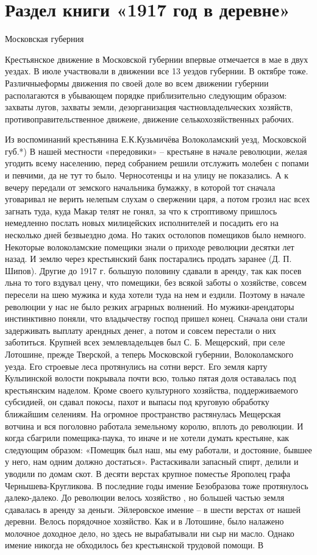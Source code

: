 \section{Раздел книги «1917 год в деревне»}

Московская губерния

Крестьянское движение в Московской губернии впервые отмечается в мае в двух уездах. В июле участвовали в движении все 13 уездов губернии. В октябре тоже. Различныеформы движения по своей доле во всем движении губернии располагаются в убывающем порядке приблизительно следующим образом: захваты лугов, захваты земли, дезорганизация частновладельческих хозяйств, противоправительственное движеие, движение селькохозяйственных рабочих.

Из воспоминаний крестьянина Е.К.Кузьмичёва Волоколамский уезд, Московской губ.*) В нашей местности «передовики» – крестьяне в начале революции, желая угодить всему населению, перед собранием решили отслужить молебен с попами и певчими, да не тут то было. Черносотенцы и на улицу не показались. А к вечеру передали от земского начальника бумажку, в которой тот сначала уговаривал не верить нелепым слухам о свержении царя, а потом грозил нас всех загнать туда, куда Макар телят не гонял, за что к строптивому пришлось немедленно послать новых милицейских исполнителей и посадить его на несколько дней безвыездно дома. Но таких остолопов помещиков было немного. Некоторые волоколамские помещики знали о приходе революции десятки лет назад. И землю через крестьянский банк постарались продать заранее (Д. П. Шипов). Другие до 1917 г. большую половину сдавали в аренду, так как посев льна то того вздувал цену, что помещики, без всякой заботы о хозяйстве, совсем пересели на шею мужика и куда хотели туда на нем и ездили. Поэтому в начале революции у нас не было резких аграрных волнений. Но мужики-арендаторы инстинктивно поняли, что владычеству господ пришел конец. Сначала они стали задерживать выплату арендных денег, а потом и совсем перестали о них заботиться. Крупней всех землевладельцев был С. Б. Мещерский, при селе Лотошине, прежде Тверской, а теперь Московской губернии, Волоколамского уезда. Его строевые леса протянулись на сотни верст. Его земля карту Кульпинской волости покрывала почти всю, только пятая доля оставалась под крестьянским наделом. Кроме своего культурного хозяйства, поддерживаемого субсидией, он сдавал покосы, пахот и выпасы под круговую обработку ближайшим селениям. На огромное пространство растянулась Мещерская вотчина и вся поголовно работала земельному королю, вплоть до революции. И когда сбагрили помещика-паука, то иначе и не хотели думать крестьяне, как следующим образом: «Помещик был наш, мы ему работали, и достояние, бывшее у него, нам одним должно достаться». Растаскивали запасный спирт, делили и уводили по домам скот. В десяти верстах крупное поместье Ярополец графа Чернышева-Кругликова. В последние годы имение Безобразова тоже протянулось далеко-далеко. До революции велось хозяйство , но большей частью земля сдавалась в аренду за деньги. Эйлеровское имение – в шести верстах от нашей деревни. Велось порядочное хозяйство. Как и в Лотошине, было налажено молочное доходное дело, но здесь не вырабатывали ни сыр ни масло. Однако имение никогда не обходилось без крестьянской трудовой помощи. В 